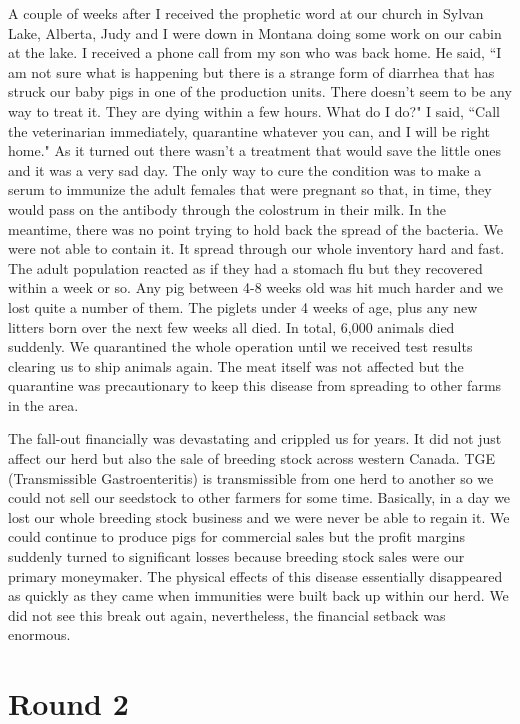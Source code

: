 \documentclass[oneside,12pt]{book}
\begin{document}
A couple of weeks after I received the prophetic word at our church in Sylvan Lake, Alberta, Judy and I were down in Montana doing some work on our cabin at the lake. I received a phone call from my son who was back home. He said, ``I am not sure what is happening but there is a strange form of diarrhea that has struck our baby pigs in one of the production units. There doesn't seem to be any way to treat it. They are dying within a few hours. What do I do?" I said, ``Call the veterinarian immediately, quarantine whatever you can, and I will be right home." As it turned out there wasn't a treatment that would save the little ones and it was a very sad day. The only way to cure the condition was to make a serum to immunize the adult females that were pregnant so that, in time, they would pass on the antibody through the colostrum in their milk. In the meantime, there was no point trying to hold back the spread of the bacteria. We were not able to contain it. It spread through our whole inventory hard and fast. The adult population reacted as if they had a stomach flu but they recovered within a week or so. Any pig between 4-8 weeks old was hit much harder and we lost quite a number of them. The piglets under 4 weeks of age, plus any new litters born over the next few weeks all died. In total, 6,000 animals died suddenly. We quarantined the whole operation until we received test results clearing us to ship animals again. The meat itself was not affected but the quarantine was precautionary to keep this disease from spreading to other farms in the area.

The fall-out financially was devastating and crippled us for years. It did not just affect our herd but also the sale of breeding stock across western Canada. TGE (Transmissible Gastroenteritis) is transmissible from one herd to another so we could not sell our seedstock to other farmers for some time. Basically, in a day we lost our whole breeding stock business and we were never be able to regain it. We could continue to produce pigs for commercial sales but the profit margins suddenly turned to significant losses because breeding stock sales were our primary moneymaker. The physical effects of this disease essentially disappeared as quickly as they came when immunities were built back up within our herd. We did not see this break out again, nevertheless, the financial setback was enormous. 


\section{Round 2}
\
\end{document}
